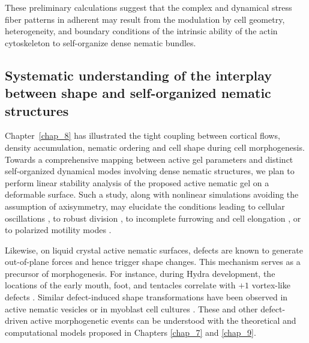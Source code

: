 These preliminary calculations suggest that the complex and dynamical stress fiber patterns in adherent may result from the modulation by cell geometry, heterogeneity, and boundary conditions of the intrinsic ability of the actin cytoskeleton to self-organize dense nematic bundles.

\subsection*{Systematic understanding of the interplay between shape and self-organized nematic structures}

Chapter~\ref{chap_8} has illustrated the tight coupling between cortical flows, density accumulation, nematic ordering and cell shape during cell morphogenesis. Towards a comprehensive mapping between active gel parameters and distinct self-organized dynamical modes involving dense nematic structures, we plan to perform linear stability analysis of the proposed active nematic gel on a deformable surface. Such a study, along with  nonlinear simulations avoiding the assumption of axisymmetry, may elucidate the conditions leading to cellular oscillations \cite{gorfinkiel2016,maitre2015}, to robust division \cite{yoshizaki2003}, to incomplete furrowing and cell elongation \cite{Dong}, or to polarized motility modes \cite{Ruprecht:2015aa}.
 
Likewise, on liquid crystal active nematic surfaces, defects are known to generate out-of-plane forces and hence trigger shape changes. This mechanism serves as a precursor of morphogenesis. For instance, during Hydra development, the locations of the early  mouth, foot, and tentacles correlate with $+1$ vortex-like defects \cite{maroudas2021}. Similar defect-induced shape transformations have been observed in active nematic vesicles \cite{keber2014} or in  myoblast cell cultures \cite{guillamat2020}. These and other defect-driven active morphogenetic events can be understood with the theoretical and computational models proposed in Chapters \ref{chap_7} and \ref{chap_9}.


